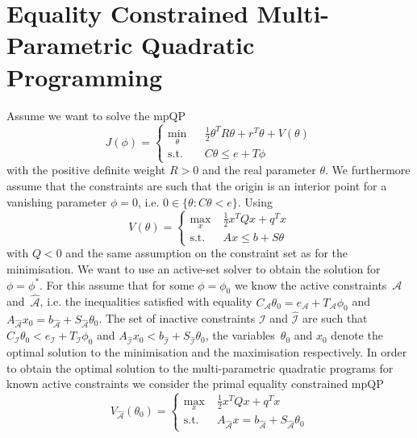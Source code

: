 \section{Equality Constrained Multi-Parametric Quadratic Programming}
Assume we want to solve the mpQP
%
\begin{equation}
	J(\phi) = \left\{\begin{array}{rcl}
	\min_\theta& &\frac{1}{2} \theta^T R \theta + r^T\theta + V(\theta) \\
	\text{s.t.}& &C\theta\leq e+ T\phi
	\end{array}\right.
\end{equation}
%
with the positive definite weight $R>0$ and the real parameter $\theta$. 
%
We furthermore assume that the constraints are such that the origin is an interior point for a vanishing parameter
$\phi=0$, i.e. $0\in\{\theta:C\theta< e\}$.
%
Using
%
\begin{equation}
	V(\theta) = \left\{\begin{split}
		\max_x & \;\frac{1}{2} x^T Q x + q^Tx\\
		\text{s.t.} &\; Ax  \leq b +S\theta
	\end{split}\right.
\end{equation}
%
with $Q<0$ and the same assumption on the constraint set as for the minimisation.
%
We want to use an active-set solver to obtain the solution for $\phi=\phi^\ast$.
%
For this assume that for some $\phi=\phi_0$ we know the active constraints~$\mathcal A$ and~$\hat{\mathcal A}$,
i.e. the inequalities satisfied with equality $C_{\mathcal A}\theta_0=e_{\mathcal A} + T_{\mathcal A}\phi_0$
and $A_{\hat{\mathcal A}}x_0=b_{\hat{\mathcal A}}+S_{\hat{\mathcal A}}\theta_0$.
%
The set of inactive constraints $\mathcal I$ and $\hat{\mathcal I}$ are such that $C_{\mathcal I}\theta_0<
e_{\mathcal I} + T_{\mathcal I}\phi_0$ and $A_{\hat{\mathcal I}}x_0<b_{\hat{\mathcal I}}+S_{\hat{\mathcal I}}
\theta_0$, the variables~$\theta_0$ and $x_0$ denote the optimal solution to the minimisation and the maximisation
respectively.
%
In order to obtain the optimal solution to the multi-parametric quadratic programs for known
active constraints we consider the primal equality constrained mpQP 
%
\begin{equation}\label{app:mpQP:primal}
	V_{\hat{\mathcal A}}(\theta_0) = \left\{\begin{split}
		\max_x & \;\frac{1}{2} x^T Q x + q^Tx\\
		\text{s.t.} &\; A_{\hat{\mathcal A}}x  = b_{\hat{\mathcal A}} +S_{\hat{\mathcal A}}\theta_0
	\end{split}\right.
\end{equation}
